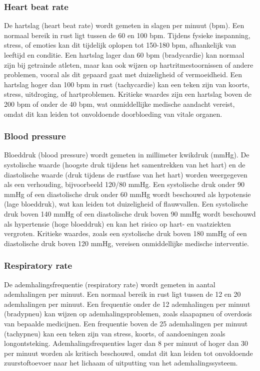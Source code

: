 \subsubsection{Heart beat rate}
De hartslag (heart beat rate) wordt gemeten in slagen per minuut (bpm). Een normaal bereik in rust ligt tussen de 60 en 100 bpm. Tijdens fysieke inspanning, stress, of emoties kan dit tijdelijk oplopen tot 150-180 bpm, afhankelijk van leeftijd en conditie. Een hartslag lager dan 60 bpm (bradycardie) kan normaal zijn bij getrainde atleten, maar kan ook wijzen op hartritmestoornissen of andere problemen, vooral als dit gepaard gaat met duizeligheid of vermoeidheid. Een hartslag hoger dan 100 bpm in rust (tachycardie) kan een teken zijn van koorts, stress, uitdroging, of hartproblemen. Kritieke waardes zijn een hartslag boven de 200 bpm of onder de 40 bpm, wat onmiddellijke medische aandacht vereist, omdat dit kan leiden tot onvoldoende doorbloeding van vitale organen.

\subsubsection{Blood pressure}
Bloeddruk (blood pressure) wordt gemeten in millimeter kwikdruk (mmHg). De systolische waarde (hoogste druk tijdens het samentrekken van het hart) en de diastolische waarde (druk tijdens de rustfase van het hart) worden weergegeven als een verhouding, bijvoorbeeld 120/80 mmHg. Een systolische druk onder 90 mmHg of een diastolische druk onder 60 mmHg wordt beschouwd als hypotensie (lage bloeddruk), wat kan leiden tot duizeligheid of flauwvallen. Een systolische druk boven 140 mmHg of een diastolische druk boven 90 mmHg wordt beschouwd als hypertensie (hoge bloeddruk) en kan het risico op hart- en vaatziekten vergroten. Kritieke waardes, zoals een systolische druk boven 180 mmHg of een diastolische druk boven 120 mmHg, vereisen onmiddellijke medische interventie.

\subsubsection{Respiratory rate}
De ademhalingsfrequentie (respiratory rate) wordt gemeten in aantal ademhalingen per minuut. Een normaal bereik in rust ligt tussen de 12 en 20 ademhalingen per minuut. Een frequentie onder de 12 ademhalingen per minuut (bradypneu) kan wijzen op ademhalingsproblemen, zoals slaapapneu of overdosis van bepaalde medicijnen. Een frequentie boven de 25 ademhalingen per minuut (tachypneu) kan een teken zijn van stress, koorts, of aandoeningen zoals longontsteking. Ademhalingsfrequenties lager dan 8 per minuut of hoger dan 30 per minuut worden als kritisch beschouwd, omdat dit kan leiden tot onvoldoende zuurstoftoevoer naar het lichaam of uitputting van het ademhalingssysteem.

